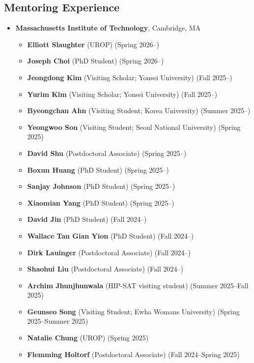 \subsection*{Mentoring Experience}
\begin{itemize}[itemsep=1pt, parsep=0pt,leftmargin=*]
  \item[] \textbf{Massachusetts Institute of Technology}, Cambridge, MA
    \begin{itemize}[itemsep=1pt, parsep=0pt,leftmargin=*]
    \item[] \textbf{Elliott Slaughter} (UROP) \hfill (Spring 2026--)
    \item[] \textbf{Joseph Choi} (PhD Student) \hfill (Spring 2026--)
    \item[] \textbf{Jeongdong Kim} (Visiting Scholar; Yonsei University) \hfill (Fall 2025--)
    \item[] \textbf{Yurim Kim} (Visiting Scholar; Yonsei University) \hfill (Fall 2025--)
    \item[] \textbf{Byeongchan Ahn} (Visiting Student; Korea University) \hfill (Summer 2025--)
    \item[] \textbf{Yeongwoo Son} (Visiting Student; Seoul National University) \hfill (Spring 2025)
    \item[] \textbf{David Shu} (Postdoctoral Associate) \hfill (Spring 2025--)
    \item[] \textbf{Boxun Huang} (PhD Student) \hfill (Spring 2025--)
    \item[] \textbf{Sanjay Johnson} (PhD Student) \hfill (Spring 2025--)
    \item[] \textbf{Xiaomian Yang} (PhD Student) \hfill (Spring 2025--)
    \item[] \textbf{David Jin} (PhD Student) \hfill (Fall 2024--)
    \item[] \textbf{Wallace Tan Gian Yion} (PhD Student) \hfill (Fall 2024--)
    \item[] \textbf{Dirk Lauinger} (Postdoctoral Associate) \hfill (Fall 2024--)
    \item[] \textbf{Shaohui Liu} (Postdoctoral Associate) \hfill (Fall 2024--)
    \item[] \textbf{Archim Jhunjhunwala} (HIP-SAT visiting student) \hfill (Summer 2025--Fall 2025)
    \item[] \textbf{Geunseo Song} (Visiting Student; Ewha Womans University) \hfill (Spring 2025--Summer 2025)
    \item[] \textbf{Natalie Chung} (UROP) \hfill (Spring 2025)
    \item[] \textbf{Flemming Holtorf} (Postdoctoral Associate) \hfill (Fall 2024--Spring 2025)

\end{itemize}
\end{itemize}
